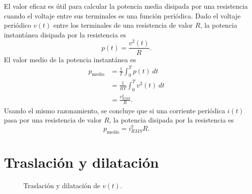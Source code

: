 \documentclass[paper=letter, fontsize=11pt]{scrartcl}
\begin{document}
El valor eficaz es útil para calcular la potencia media disipada por una
resistencia cuando el voltaje entre sus terminales es una función periódica.
Dado el voltaje periódico $v(t)$ entre los terminales de una resistencia de
valor $R$, la potencia instantánea disipada por la resistencia es
%
\begin{equation}
  p(t) = \frac{v^2(t)}{R}.
\end{equation}
%
El valor medio de la potencia instantánea es
%
\begin{equation*}
  \begin{split}
    p_{\text{medio}} &= \frac{1}{T} \int_0^T p(t) \ dt \\
    &= \frac{1}{R T} \int_0^T v^2(t) \ dt \\
    &= \frac{v^2_{RMS}}{R}.
  \end{split}
\end{equation*}
%
Usando el mismo razonamiento, se concluye que si una corriente periódica $i(t)$
pasa por una resistencia de valor $R$, la potencia disipada por la resistencia
es
%
\begin{equation*}
   p_{\text{medio}} = i^2_{RMS} R.
 \end{equation*}

\section{Traslación y dilatación}

\begin{figure}[ht!]
  \centering
  \caption{Traslación y dilatación de $v(t)$.}
\label{fig:trans}
\end{figure}
\end{document}
